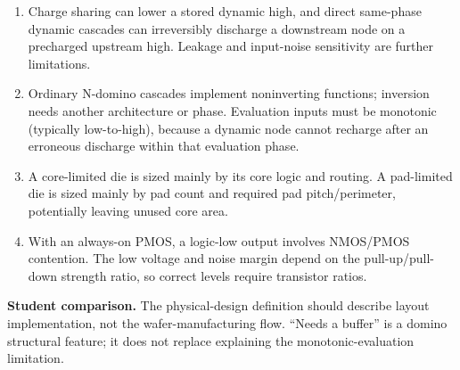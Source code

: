 \documentclass[10pt]{article}
\begin{document}
\begin{enumerate}[label=(\alph*),leftmargin=7mm,itemsep=4pt]
\item Charge sharing can lower a stored dynamic high, and direct same-phase dynamic cascades can irreversibly discharge a downstream node on a precharged upstream high. Leakage and input-noise sensitivity are further limitations.
\item Ordinary N-domino cascades implement noninverting functions; inversion needs another architecture or phase. Evaluation inputs must be monotonic (typically low-to-high), because a dynamic node cannot recharge after an erroneous discharge within that evaluation phase.
\item A core-limited die is sized mainly by its core logic and routing. A pad-limited die is sized mainly by pad count and required pad pitch/perimeter, potentially leaving unused core area.
\item With an always-on PMOS, a logic-low output involves NMOS/PMOS contention. The low voltage and noise margin depend on the pull-up/pull-down strength ratio, so correct levels require transistor ratios.
\end{enumerate}
\textbf{Student comparison.} The physical-design definition should describe layout implementation, not the wafer-manufacturing flow. ``Needs a buffer'' is a domino structural feature; it does not replace explaining the monotonic-evaluation limitation.
\end{document}
